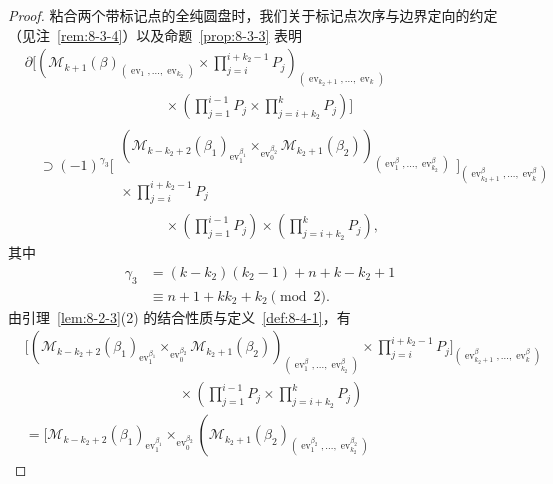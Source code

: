 \begin{proof}
粘合两个带标记点的全纯圆盘时，我们关于标记点次序与边界定向的约定
（见注~\ref{rem:8-3-4}）以及命题~\ref{prop:8-3-3} 表明
\[
\begin{aligned}
 &\partial\Bigg[
 \left(
 \mathcal M_{k+1}(\beta)_
 {(\operatorname{ev}_1,\ldots,\operatorname{ev}_{k_2})}
 \times\prod_{j=i}^{i+k_2-1}P_j
 \right)_
 {(\operatorname{ev}_{k_2+1},\ldots,\operatorname{ev}_k)}\\[-2pt]
 &\hspace{10em}{}\times
 \left(\prod_{j=1}^{i-1}P_j\times
 \prod_{j=i+k_2}^{k}P_j\right)\Bigg]\\
 &\quad\supset(-1)^{\gamma_3}
 \Bigg[
 \begin{gathered}
 \left(
 \mathcal M_{k-k_2+2}(\beta_1)_
 {\operatorname{ev}_1^{\beta_1}}
 \mathop{\times}_{\operatorname{ev}_0^{\beta_2}}
 \mathcal M_{k_2+1}(\beta_2)
 \right)_
 {(\operatorname{ev}_1^\beta,\ldots,
   \operatorname{ev}_{k_2}^\beta)}\\[-2pt]
 {}\times\displaystyle\prod_{j=i}^{i+k_2-1}P_j
 \end{gathered}
 \Bigg]_
 {(\operatorname{ev}_{k_2+1}^\beta,\ldots,
   \operatorname{ev}_{k}^\beta)}\\[-2pt]
 &\hspace{10em}{}\times
 \left(\prod_{j=1}^{i-1}P_j\right)
 \times\left(\prod_{j=i+k_2}^{k}P_j\right),
\end{aligned}
\]
其中
\[
\begin{aligned}
 \gamma_3
 &=(k-k_2)(k_2-1)+n+k-k_2+1\\
 &\equiv n+1+kk_2+k_2\pmod2.
\end{aligned}
\]
由引理~\ref{lem:8-2-3}(2) 的结合性质与定义~\ref{def:8-4-1}，有
\begingroup
\small
\[
\begin{aligned}
 &\Bigg[
 \left(
 \mathcal M_{k-k_2+2}(\beta_1)_
 {\operatorname{ev}_1^{\beta_1}}
 \mathop{\times}_{\operatorname{ev}_0^{\beta_2}}
 \mathcal M_{k_2+1}(\beta_2)
 \right)_
 {(\operatorname{ev}_1^\beta,\ldots,
   \operatorname{ev}_{k_2}^\beta)}
 \times\prod_{j=i}^{i+k_2-1}P_j
 \Bigg]_
 {(\operatorname{ev}_{k_2+1}^\beta,\ldots,
   \operatorname{ev}_{k}^\beta)}\\[-2pt]
 &\hspace{11em}{}\times
 \left(\prod_{j=1}^{i-1}P_j\times
 \prod_{j=i+k_2}^{k}P_j\right)\\
 &={}
 \Bigg[
 \mathcal M_{k-k_2+2}(\beta_1)_
 {\operatorname{ev}_1^{\beta_1}}
 \mathop{\times}_{\operatorname{ev}_0^{\beta_2}}
 \left(
 \mathcal M_{k_2+1}(\beta_2)_
 {(\operatorname{ev}_1^{\beta_2},\ldots,
   \operatorname{ev}_{k_2}^{\beta_2})}

\end{aligned}\]
\end{proof}
